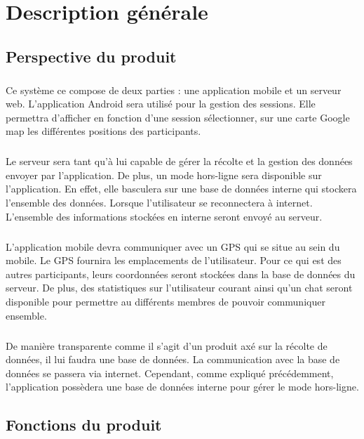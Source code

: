 \documentclass[titlepage, 12pt]{report}
\begin{document}
\chapter{Description générale}

\section{Perspective du produit}

\paragraph{}Ce système ce compose de deux parties : une application mobile et un serveur web.
L'application Android sera utilisé pour la gestion des sessions. Elle permettra d'afficher en fonction d'une session sélectionner, sur une carte Google map les différentes positions des participants.
\paragraph{}Le serveur sera tant qu'à lui capable de gérer la récolte et la gestion des données envoyer par l'application.
De plus, un mode hors-ligne sera disponible sur l'application. En effet, elle basculera sur une base de données interne qui stockera l'ensemble des données. Lorsque l'utilisateur se reconnectera à internet. L'ensemble des informations stockées en interne seront envoyé au serveur.
\paragraph{}L'application mobile devra communiquer avec un GPS qui se situe au sein du mobile. Le GPS fournira les emplacements de l'utilisateur. Pour ce qui est des autres participants, leurs coordonnées seront stockées dans la base de données du serveur. De plus, des statistiques sur l'utilisateur courant ainsi qu'un chat seront disponible pour permettre au différents membres de pouvoir communiquer ensemble.
\paragraph{}De manière transparente comme il s'agit d'un produit axé sur la récolte de données, il lui faudra une base de données. La communication avec la base de données se passera via internet. Cependant, comme expliqué précédemment, l'application possèdera une base de données interne pour gérer le mode hors-ligne. 

\section{Fonctions du produit}
\end{document}
